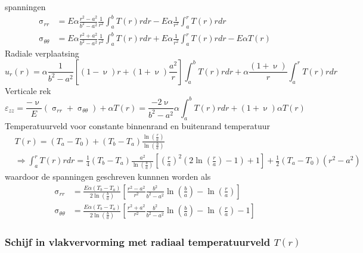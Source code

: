                 spanningen
                \begin{align}
                    \upsigma_{rr} &= E\alpha\frac{r^2-a^2}{b^2-a^2}\frac{1}{r^2}\int_a^bT(r)rdr-E\alpha\frac{1}{r^2}\int_a^rT(r)rdr\nonumber\\
                    \upsigma_{\theta\theta} &= E\alpha\frac{r^2+a^2}{b^2-a^2}\frac{1}{r^2}\int_a^bT(r)rdr+E\alpha\frac{1}{r^2}\int_a^rT(r)rdr-E\alpha T(r)
                \end{align}
                Radiale verplaatsing
                \begin{equation}
                    u_r(r) = \alpha\frac{1}{b^2-a^2}\left[(1-\upnu)r+(1+\upnu)\frac{a^2}{r}\right]\int_a^bT(r)rdr + \alpha\frac{(1+\upnu)}{r}\int_a^rT(r)rdr
                \end{equation}
                Verticale rek
                \begin{equation}
                    \varepsilon_{zz} = \frac{-\upnu}{E}(\upsigma_{rr}+\upsigma_{\theta\theta}) + \alpha T(r) = \frac{-2\upnu}{b^2-a^2}\alpha\int_a^bT(r)rdr+(1+\upnu)\alpha T(r)
                \end{equation}
                Temperatuurveld voor constante binnenrand en buitenrand temperatuur
                \begin{align}
                    &T(r) = (T_a-T_0)+(T_b-T_a)\frac{\ln\left(\frac{r}{a}\right)}{\ln\left(\frac{b}{a}\right)}\nonumber\\
                    &\Rightarrow \int_a^rT(r)rdr=\frac{1}{4}(T_b-T_a)\frac{a^2}{\ln\left(\frac{b}{a}\right)}\left[\left(\frac{r}{a}\right)^2\left(2\ln\left(\frac{r}{a}\right)-1\right)+1\right]+\frac{1}{2}(T_a-T_0)(r^2-a^2)
                \end{align}
                waardoor de spanningen geschreven kunnnen worden als
                \begin{align}
                    \upsigma_{rr} & = \frac{E\alpha(T_b-T_a)}{2\ln\left(\frac{b}{a}\right)}\left[\frac{r^2-a^2}{r^2}\frac{b^2}{b^2-a^2}\ln\left(\frac{b}{a}\right)-\ln\left(\frac{r}{a}\right)\right]\nonumber\\
                    \upsigma_{\theta\theta} & = \frac{E\alpha(T_b-T_a)}{2\ln\left(\frac{b}{a}\right)}\left[\frac{r^2+a^2}{r^2}\frac{b^2}{b^2-a^2}\ln\left(\frac{b}{a}\right)-\ln\left(\frac{r}{a}\right)-1\right]
                \end{align}
                
        \subsubsection{Schijf in vlakvervorming met radiaal temperatuurveld $T(r)$}

